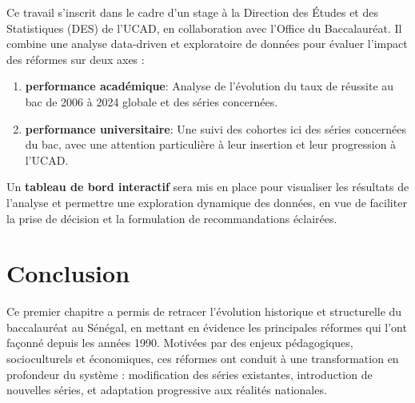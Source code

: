 Ce travail s’inscrit dans le cadre d’un stage à la Direction des Études et des Statistiques (DES) de l’UCAD, en collaboration avec l’Office du Baccalauréat. 
Il combine une analyse data-driven et exploratoire de données pour évaluer l’impact des réformes sur deux axes :
\begin{enumerate}
    \item \textbf{performance académique}: Analyse de l'évolution du taux de réussite au bac de 2006 à 2024 globale et des séries concernées.
    \item \textbf{performance universitaire}: Une suivi des cohortes ici des séries concernées du bac, avec une attention particulière à leur insertion et leur progression à l’UCAD. 
\end{enumerate}
Un \textbf{tableau de bord interactif} sera mis en place pour visualiser les résultats de l'analyse et permettre une exploration dynamique des données, en vue de faciliter la prise de décision et la formulation de recommandations éclairées.

\section{Conclusion}

Ce premier chapitre a permis de retracer l’évolution historique et structurelle du baccalauréat au Sénégal, en mettant en évidence les principales réformes qui l’ont façonné depuis les années 1990. 
Motivées par des enjeux pédagogiques, socioculturels et économiques, ces réformes ont conduit à une transformation en profondeur du système : modification des séries existantes, introduction de nouvelles séries, et adaptation progressive aux réalités nationales.
